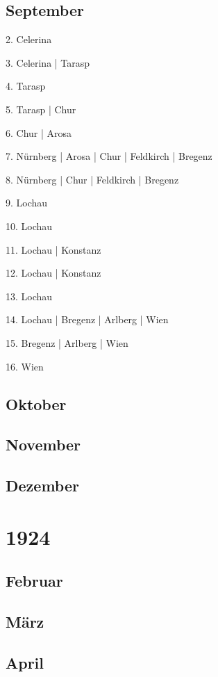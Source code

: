 \documentclass[twoside=false,titlepage=false,open=any, parskip=never, fontsize=10pt, headings=small, chapterprefix=false, appendixprefix=false, DIV=15]{scrbook}
\begin{document}
\begin{multicols}{3}
            \section*{September}
            2. Celerina\par
            3. Celerina | Tarasp\par
            4. Tarasp\par
            5. Tarasp | Chur\par
            6. Chur | Arosa\par
            7. Nürnberg | Arosa | Chur | Feldkirch | Bregenz\par
            8. Nürnberg | Chur | Feldkirch | Bregenz\par
            9. Lochau\par
            10. Lochau\par
            11. Lochau | Konstanz\par
            12. Lochau | Konstanz\par
            13. Lochau\par
            14. Lochau | Bregenz | Arlberg | Wien\par
            15. Bregenz | Arlberg | Wien\par
            16. Wien\par
            \section*{Oktober}
            \section*{November}
            \section*{Dezember}
            \chapter*{1924}
            \section*{Februar}
            \section*{März}
            \section*{April}

\end{multicols}
\end{document}
